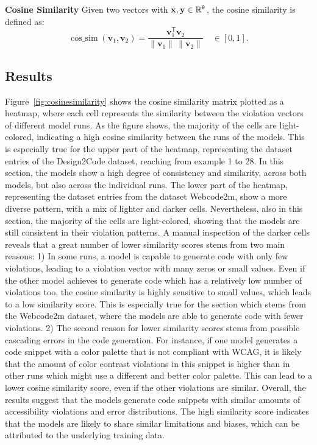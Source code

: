 \textbf{Cosine Similarity}  
  Given two vectors with $\mathbf x,\mathbf y\in\mathbb R^{k}$, the cosine similarity is defined as:
  \[
  \operatorname{cos\_sim}(\mathbf v_1,\mathbf v_2)=
  \frac{\mathbf v_1^{\mathsf T}\mathbf v_2}{\lVert \mathbf v_1\rVert\,\lVert \mathbf v_2\rVert}
  \quad\in[0,1].
\]


\subsection{Results}
Figure~\ref{fig:cosinesimilarity} shows the cosine similarity matrix 
plotted as a heatmap, where each cell represents the similarity between 
the violation vectors of different model runs. 
As the figure shows, the majority of the cells 
are light-colored, indicating a high cosine similarity 
between the runs of the models. This is especially true 
for the upper part of the heatmap, representing the 
dataset entries of the Design2Code dataset, reaching 
from example 1 to 28. In this section, the models 
show a high degree of consistency and similarity, across 
both models, but also across the individual runs.
The lower part of the heatmap, representing the
dataset entries from the dataset Webcode2m, show 
a more diverse pattern, with a mix of lighter and 
darker cells. Nevertheless, also in this section, 
the majority of the cells are light-colored, showing
that the models are still consistent in their violation 
patterns. A manual inspection of the darker cells reveals 
that a great number of lower similarity scores stems from 
two main reasons: 1) In some runs, a model is capable 
to generate code with only few violations, leading to 
a violation vector with many zeros or small values. 
Even if the other model achieves to generate code 
which has a relatively low number of violations too, 
the cosine similarity is highly sensitive to 
small values, which leads to a low similarity score. 
This is especially true for the section which stems from 
the Webcode2m dataset, where the models are able to
generate code with fewer violations. 
2) The second reason for lower similarity scores stems 
from possible cascading errors in the code generation. 
For instance, if one model generates a code snippet with
a color palette that is not compliant with WCAG, it 
is likely that the amount of color contrast violations 
in this snippet is higher than in other runs which 
might use a different and better color palette. 
This can lead to a lower cosine similarity score, even
if the other violations are similar.\newline 
Overall, the results suggest that the models generate 
code snippets with similar amounts of accessibility violations
and error distributions. The high similarity score 
indicates that the models are likely to share similar
limitations and biases, which can be attributed to the
underlying training data.

